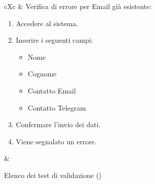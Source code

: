 \begin{table}[H]
\begin{VTtable}[1.7]{\textwidth}{cXc}
        \addtotv & Verifica di errore per Email già esistente:
		\begin{enumerate}
			\item Accedere al sistema.
            \item Inserire i seguenti campi:
                \begin{itemize}
                    \item Nome
                    \item Cognome
                    \item Contatto Email
                    \item Contatto Telegram
                \end{itemize}
            \item Confermare l'invio dei dati.
            \item Viene segnalato un errore.
		\end{enumerate}
		& \TNI \\
        \bottomrule
	\end{VTtable}
	\caption{Elenco dei test di validazione (\thetableCounter)}
\end{table}

